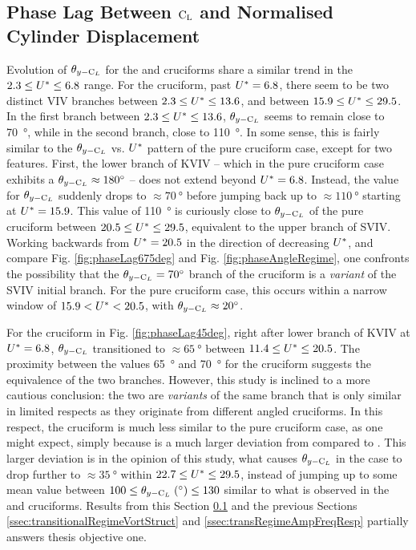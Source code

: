\documentclass[oneside]{utmthesis}
\begin{document}
\subsection{Phase Lag Between $\text{C}_{\text{L}}$ and Normalised Cylinder Displacement} \label{ssec:phaseLag67545}

Evolution of $\theta_{y-\text{C}_{L}}$ for the \angfo{} and \angth{} cruciforms share a similar trend in the $2.3 \leq U^{*} \leq 6.8$ range. For the \angfo{} cruciform, past $U^{*} = 6.8$, there seem to be two distinct VIV branches between $2.3 \leq U^{*} \leq 13.6$, and between $15.9 \leq U^{*} \leq 29.5$. In the first branch between $2.3 \leq U^{*} \leq 13.6$, $\theta_{y-\text{C}_{L}}$ seems to remain close to \SI{70}{\degree}, while in the second branch, close to \SI{110}{\degree}. In some sense, this is fairly similar to the $\theta_{y-\text{C}_{L}}$ vs. $U^{*}$ pattern of the pure cruciform case, except for two features. First, the lower branch of KVIV -- which in the pure cruciform case exhibits a $\plag \approx \SI{180}{\degree}$ -- does not extend beyond $U^{*} = 6.8$. Instead, the value for $\theta_{y-\text{C}_{L}}$ suddenly drops to $\approx \SI{70}{\degree}$ before jumping back up to $\approx \SI{110}{\degree}$ starting at $U^{*} = 15.9$. This value of \SI{110}{\degree} is curiously close to $\theta_{y-\text{C}_{L}}$ of the pure cruciform between $20.5 \leq U^{*} \leq 29.5$, equivalent to the upper branch of SVIV. Working backwards from $U^{*} = 20.5$ in the direction of decreasing $U^{*}$, and compare Fig. \ref{fig:phaseLag675deg} and Fig. \ref{fig:phaseAngleRegime}, one confronts the possibility that the $\plag = \SI{70}{\degree}$ branch of the \angfo cruciform is a \textit{variant} of the SVIV initial branch. For the pure cruciform case, this occurs within a narrow window of $15.9 < U^{*} < 20.5$, with $\plag \approx \SI{20}{\degree}$.

For the \angth{} cruciform in Fig. \ref{fig:phaseLag45deg}, right after lower branch of KVIV at $U^{*} = 6.8$, $\theta_{y-\text{C}_{L}}$ transitioned to $\approx \SI{65}{\degree}$ between $11.4 \leq U^{*} \leq 20.5$. The proximity between the values \SI{65}{\degree} and \SI{70}{\degree} for the \angfo{} cruciform suggests the equivalence of the two branches. However, this study is inclined to a more cautious conclusion: the two are \textit{variants} of the same branch that is only similar in limited respects as they originate from different angled cruciforms. In this respect, the \angth{} cruciform is much less similar to the pure cruciform case, as one might expect, simply because \angth{} is a much larger deviation from \angfi{} compared to \angfo{}. This larger deviation is in the opinion of this study, what causes $\theta_{y-\text{C}_{L}}$ in the \angth{} case to drop further to $\approx \SI{35}{\degree}$ within $22.7 \leq U^{*} \leq 29.5$, instead of jumping up to some mean value between $100 \leq \plag \; (\si{\degree}) \leq 130$ similar to what is observed in the \angfi{} and \angfo{} cruciforms. Results from this Section \ref{ssec:phaseLag67545} and the previous Sections \ref{ssec:transitionalRegimeVortStruct} and \ref{ssec:transRegimeAmpFreqResp} partially answers thesis objective one.
\end{document}
